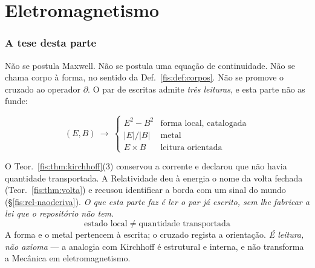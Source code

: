 \documentclass[livro.tex]{subfiles}
\begin{document}
\part{Eletromagnetismo}

\section*{A tese desta parte}\label{fis:em-tese}

\noindent Não se postula Maxwell. Não se postula uma equação de continuidade.
Não se chama corpo à forma, no sentido da Def.~\ref{fis:def:corpos}. Não se
promove o cruzado ao operador $\partial$. O par de escritas admite \emph{três
leituras}, e esta parte não as funde:

\[
\boxed{\;
(E,B)
\ \longrightarrow\
\begin{cases}
E^{2}-B^{2} & \text{forma local, catalogada}\\[2pt]
\lvert E\rvert/\lvert B\rvert & \text{metal}\\[2pt]
E\times B & \text{leitura orientada}
\end{cases}
\;}
\]

O Teor.~\ref{fis:thm:kirchhoff}(3) conservou a corrente e declarou que não
havia quantidade transportada. A Relatividade deu à energia o nome da volta
fechada (Teor.~\ref{fis:thm:volta}) e recusou identificar a borda com um sinal
do mundo (§\ref{fis:rel-naoderiva}). \emph{O que esta parte faz é ler o par
já escrito, sem lhe fabricar a lei que o repositório não tem.}
\[
\boxed{\;\text{estado local}\;\neq\;\text{quantidade transportada}\;}
\]
A forma e o metal pertencem à escrita; o cruzado regista a orientação. \emph{É
leitura, não axioma} --- a analogia com Kirchhoff é estrutural e interna, e
não transforma a Mecânica em eletromagnetismo.
\end{document}

